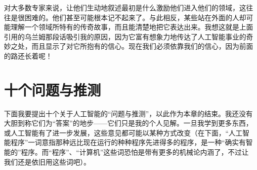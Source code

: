 对大多数专家来说，让他们生动地叙述最初是什么激励他们进入他们的领域，这往往是很困难的。他们甚至可能根本记不起来了。与此相反，某些站在外面的人却可能理解一个领域所特有的传奇故事，而且能清楚地把它表达出来。我想这就是上面引用的乌兰姆那段话吸引我的原因，因为它富有想象力地传达了人工智能事业的奇妙之处，而且显示了对它所抱有的信心。现在我们必须依靠我们的信心，因为前面的路还长着呢！

\section{十个问题与推测}

下面我要提出十个关于人工智能的“问题与推测”，以此作为本章的结束。我还没有大胆到称它们为“答案”的地步——它们只是我的个人见解。一旦我学到更多东西，或人工智能有了进一步发展，这些意见都可能以某种方式改变（在下面，“人工智能程序”一词意指那种远比现在运行的种种程序先进得多的程序，是一种“确实有智能的”程序。而“程序”、“计算机”这些词恐怕是带有更多的机械论内涵了，不过让我们还是依旧用这些词吧）。

